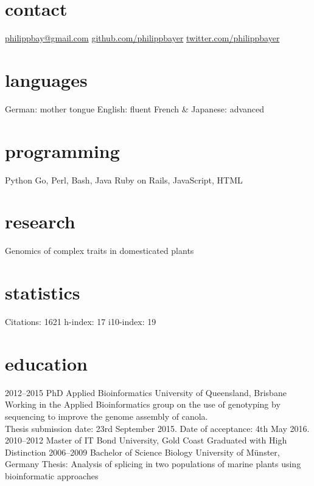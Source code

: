\documentclass[]{friggeri-cv} %
\begin{document}


\begin{aside} %
\section{contact}
\href{mailto:philippbay@gmail.com}{philippbay@gmail.com}
\href{http://github.com/philippbayer}{github.com/philippbayer}
\href{http://twitter.com/philippbayer}{twitter.com/philippbayer}
\section{languages}
German: mother tongue
English: fluent
French \& Japanese: advanced
\section{programming}
Python
Go, Perl, Bash, Java
Ruby on Rails, JavaScript, HTML
\section{research}
Genomics of complex traits in domesticated plants
\section{statistics}
Citations: 1621
h-index: 17
i10-index: 19
\end{aside}


\section{education}

\begin{entrylist}
\entry
{2012--2015}
{PhD {\normalfont Applied Bioinformatics}}
{University of Queensland, Brisbane}
{Working in the Applied Bioinformatics group on the use of genotyping by sequencing to improve the genome assembly of canola.\\Thesis submission date: 23rd September 2015. Date of acceptance: 4th May 2016.}
\entry
{2010--2012}
{Master {\normalfont of IT}}
{Bond University, Gold Coast}
{Graduated with High Distinction}
\entry
{2006--2009}
{Bachelor of Science {\normalfont Biology}}
{University of Münster, Germany}
{Thesis: Analysis of splicing in two populations of marine plants
using bioinformatic approaches}
\end{entrylist}
\end{document}
